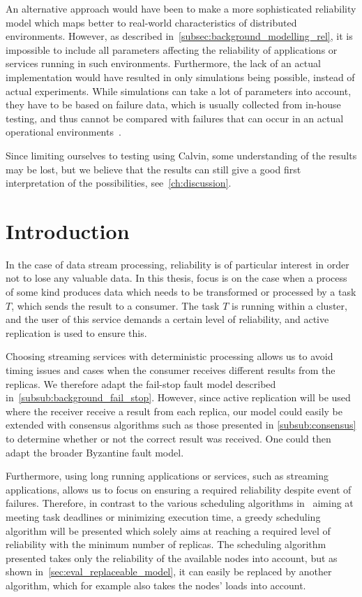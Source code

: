 \documentclass{cslthse-msc}
\begin{document}
An alternative approach would have been to make a more sophisticated reliability model which maps better to real-world characteristics of distributed environments. However, as described in~\cref{subsec:background_modelling_rel}, it is impossible to include all parameters affecting the reliability of applications or services running in such environments. Furthermore, the lack of an actual implementation would have resulted in only simulations being possible, instead of actual experiments. While simulations can take a lot of parameters into account, they have to be based on failure data, which is usually collected from in-house testing, and thus cannot be compared with failures that can occur in an actual operational environments~\cite{surveyReliabilityDistr}. %

Since limiting ourselves to testing using Calvin, some understanding of the results may be lost, but we believe that the results can still give a good first interpretation of the possibilities, see~\cref{ch:discussion}. 

\section{Introduction} \label{sec:design_intro}
In the case of data stream processing, reliability is of particular interest in order not to lose any valuable data. In this thesis, focus is on the case when a process of some kind produces data which needs to be transformed or processed by a task $T$, which sends the result to a consumer. The task $T$ is running within a cluster, and the user of this service demands a certain level of reliability, and active replication is used to ensure this.	

Choosing streaming services with deterministic processing allows us to avoid timing issues and cases when the consumer receives different results from the replicas. We therefore adapt the fail-stop fault model described in~\cref{subsub:background_fail_stop}. However, since active replication will be used where the receiver receive a result from each replica, our model could easily be extended with consensus algorithms such as those presented in \cref{subsub:consensus} to determine whether or not the correct result was received. One could then adapt the broader Byzantine fault model. 

Furthermore, using long running applications or services, such as streaming applications, allows us to focus on ensuring a required reliability despite event of failures. Therefore, in contrast to the various scheduling algorithms in~\cite{algoOptTimeMaxRel, optTaskAllocationForMaxRel, taskAllocation, taskAllocationSwarm, algoMaxRelEndToEndConstraint, algoMinExTime, schedReplicas} aiming at meeting task deadlines or minimizing execution time, a greedy scheduling algorithm will be presented which solely aims at reaching a required level of reliability with the minimum number of replicas. The scheduling algorithm presented takes only the reliability of the available nodes into account, but as shown in~\cref{sec:eval_replaceable_model}, it can easily be replaced by another algorithm, which for example also takes the nodes' loads into account.
\end{document}
